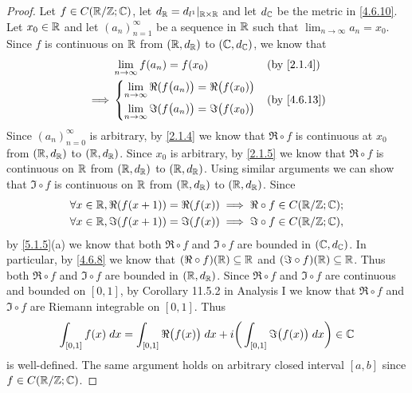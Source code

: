 \begin{proof}
  Let \(f \in C(\mathbb{R} / \mathbb{Z} ; \mathbb{C})\), let \(d_{\mathbb{R}} = d_{l^1}|_{\mathbb{R} \times \mathbb{R}}\) and let \(d_{\mathbb{C}}\) be the metric in \cref{4.6.10}.
  Let \(x_0 \in \mathbb{R}\) and let \((a_n)_{n = 1}^\infty\) be a sequence in \(\mathbb{R}\) such that \(\lim_{n \to \infty} a_n = x_0\).
  Since \(f\) is continuous on \(\mathbb{R}\) from \((\mathbb{R}, d_{\mathbb{R}})\) to \((\mathbb{C}, d_{\mathbb{C}})\), we know that
  \begin{align*}
             & \lim_{n \to \infty} f(a_n) = f(x_0)                                           &  & \by{2.1.4} \\
    \implies & \begin{dcases}
                 \lim_{n \to \infty} \Re(f\big(a_n)\big) = \Re\big(f(x_0)\big) \\
                 \lim_{n \to \infty} \Im(f\big(a_n)\big) = \Im\big(f(x_0)\big)
               \end{dcases} &  & \by{4.6.13}
  \end{align*}
  Since \((a_n)_{n = 0}^\infty\) is arbitrary, by \cref{2.1.4} we know that \(\Re \circ f\) is continuous at \(x_0\) from \((\mathbb{R}, d_{\mathbb{R}})\) to \((\mathbb{R}, d_{\mathbb{R}})\).
  Since \(x_0\) is arbitrary, by \cref{2.1.5} we know that \(\Re \circ f\) is continuous on \(\mathbb{R}\) from \((\mathbb{R}, d_{\mathbb{R}})\) to \((\mathbb{R}, d_{\mathbb{R}})\).
  Using similar arguments we can show that \(\Im \circ f\) is continuous on \(\mathbb{R}\) from \((\mathbb{R}, d_{\mathbb{R}})\) to \((\mathbb{R}, d_{\mathbb{R}})\).
  Since
  \begin{align*}
     & \forall x \in \mathbb{R}, \Re(f(x + 1)) = \Re(f(x)) \implies \Re \circ f \in C(\mathbb{R} / \mathbb{Z} ; \mathbb{C}); \\
     & \forall x \in \mathbb{R}, \Im(f(x + 1)) = \Im(f(x)) \implies \Im \circ f \in C(\mathbb{R} / \mathbb{Z} ; \mathbb{C}),
  \end{align*}
  by \cref{5.1.5}(a) we know that both \(\Re \circ f\) and \(\Im \circ f\) are bounded in \((\mathbb{C}, d_{\mathbb{C}})\).
  In particular, by \cref{4.6.8} we know that \((\Re \circ f)(\mathbb{R}) \subseteq \mathbb{R}\) and \((\Im \circ f)(\mathbb{R}) \subseteq \mathbb{R}\).
  Thus both \(\Re \circ f\) and \(\Im \circ f\) are bounded in \((\mathbb{R}, d_{\mathbb{R}})\).
  Since \(\Re \circ f\) and \(\Im \circ f\) are continuous and bounded on \([0, 1]\), by Corollary 11.5.2 in Analysis I we know that \(\Re \circ f\) and \(\Im \circ f\) are Riemann integrable on \([0, 1]\).
  Thus
  \[
    \int_{[0, 1]} f(x) \; dx = \int_{[0, 1]} \Re\big(f(x)\big) \; dx + i \bigg(\int_{[0, 1]} \Im\big(f(x)\big) \; dx\bigg) \in \mathbb{C}
  \]
  is well-defined.
  The same argument holds on arbitrary closed interval \([a, b]\) since \(f \in C(\mathbb{R} / \mathbb{Z} ; \mathbb{C})\).
\end{proof}

